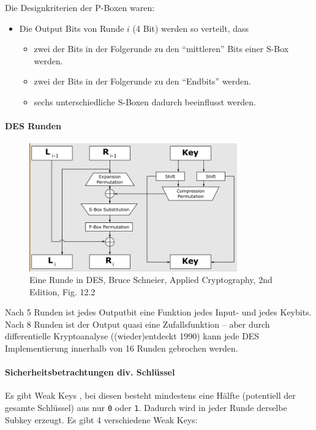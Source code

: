 Die Designkriterien der P-Boxen waren:

\begin{itemize}
    \item Die Output Bits von Runde $i$ (4 Bit) werden so verteilt, dass
    \begin{itemize}
        \item zwei der Bits in der Folgerunde zu den ``mittleren'' Bits einer S-Box werden. 
        \item zwei der Bits in der Folgerunde zu den ``Endbits'' werden. 
        \item sechs unterschiedliche S-Boxen dadurch beeinflusst werden.
    \end{itemize}
\end{itemize}

\paragraph{DES Runden}

\begin{figure}[h]
    \includegraphics[width=0.8\textwidth]{figures/fig5-des-round.png}
    \centering
    \caption{Eine Runde in DES, Bruce Schneier, Applied Cryptography, 2nd Edition, Fig. 12.2}
\end{figure}


Nach 5 Runden ist jedes Outputbit eine Funktion jedes Input- und jedes Keybits.
Nach 8 Runden ist der Output quasi eine Zufallsfunktion -- aber durch differentielle Kryptoanalyse ((wieder)entdeckt 1990)
kann jede DES Implementierung innerhalb von 16 Runden gebrochen werden. 

\paragraph{Sicherheitsbetrachtungen div. Schlüssel}

Es gibt Weak Keys , bei diesen besteht mindestens eine Hälfte (potentiell der gesamte Schlüssel) aus nur \verb|0| oder \verb|1|. Dadurch wird in jeder 
Runde derselbe Subkey erzeugt. Es gibt 4 verschiedene Weak Keys:

